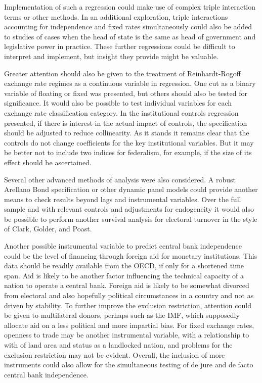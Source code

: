 \documentclass{article}
\begin{document}
    Implementation of such a regression could make use of complex triple interaction terms or other methods. In an additional exploration, triple interactions accounting for independence and fixed rates simultaneously could also be added to studies of cases when the head of state is the same as head of government and legislative power in practice. These further regressions could be difficult to interpret and implement, but insight they provide might be valuable.

    Greater attention should also be given to the treatment of Reinhardt-Rogoff exchange rate regimes as a continuous variable in regression. One cut as a binary variable of floating or fixed was presented, but others should also be tested for significance. It would also be possible to test individual variables for each exchange rate classification category.
    In the institutional controls regression presented, if there is interest in the actual impact of controls, the specification should be adjusted to reduce collinearity. As it stands it remains clear that the controls do not change coefficients for the key institutional variables. But it may be better not to include two indices for federalism, for example, if the size of its effect should be ascertained.

    Several other advanced methods of analysis were also considered. A robust Arellano Bond specification or other dynamic panel models could provide another means to check results beyond lags and instrumental variables. Over the full sample and with relevant controls and adjustments for endogeneity it would also be possible to perform another survival analysis for electoral turnover in the style of Clark, Golder, and Poast.

    Another possible instrumental variable to predict central bank independence could be the level of financing through foreign aid for monetary institutions. This data should be readily available from the OECD, if only for a shortened time span. Aid is likely to be another factor influencing the technical capacity of a nation to operate a central bank. Foreign aid is likely to be somewhat divorced from electoral and also hopefully political circumstances in a country and not as driven by stability. To further improve the exclusion restriction, attention could be given to multilateral donors, perhaps such as the IMF, which supposedly allocate aid on a less political and more impartial bias. For fixed exchange rates, openness to trade may be another instrumental variable, with a relationship to with of land area and status as a landlocked nation, and problems for the exclusion restriction may not be evident. Overall, the inclusion of more instruments could also allow for the simultaneous testing of de jure and de facto central bank independence.
\end{document}
